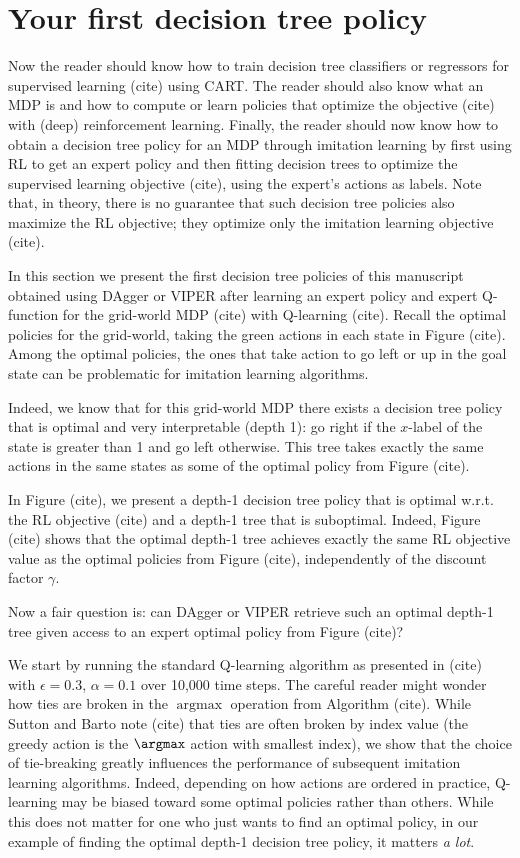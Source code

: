 \section{Your first decision tree policy}
Now the reader should know how to train decision tree classifiers or regressors for supervised learning (cite) using CART.
The reader should also know what an MDP is and how to compute or learn policies that optimize the objective (cite) with (deep) reinforcement learning.
Finally, the reader should now know how to obtain a decision tree policy for an MDP through imitation learning by first using RL to get an expert policy and then fitting decision trees to optimize the supervised learning objective (cite), using the expert's actions as labels.
Note that, in theory, there is no guarantee that such decision tree policies also maximize the RL objective; they optimize only the imitation learning objective (cite).

In this section we present the first decision tree policies of this manuscript obtained using DAgger or VIPER after learning an expert policy and expert Q-function for the grid-world MDP (cite) with Q-learning (cite).
Recall the optimal policies for the grid-world, taking the green actions in each state in Figure (cite). 
Among the optimal policies, the ones that take action to go left or up in the goal state can be problematic for imitation learning algorithms.

Indeed, we know that for this grid-world MDP there exists a decision tree policy that is optimal and very interpretable (depth 1): go right if the $x$-label of the state is greater than 1 and go left otherwise.
This tree takes exactly the same actions in the same states as some of the optimal policy from Figure (cite).

In Figure (cite), we present a depth-1 decision tree policy that is optimal w.r.t. the RL objective (cite) and a depth-1 tree that is suboptimal.
Indeed, Figure (cite) shows that the optimal depth-1 tree achieves exactly the same RL objective value as the optimal policies from Figure (cite), independently of the discount factor $\gamma$.

Now a fair question is: can DAgger or VIPER retrieve such an optimal depth-1 tree given access to an expert optimal policy from Figure (cite)?

We start by running the standard Q-learning algorithm as presented in (cite) with $\epsilon=0.3$, $\alpha=0.1$ over 10,000 time steps.
The careful reader might wonder how ties are broken in the $\operatorname{argmax}$ operation from Algorithm (cite).
While Sutton and Barto note (cite) that ties are often broken by index value (the greedy action is the $\argmax$ action with smallest index), we show that the choice of tie-breaking greatly influences the performance of subsequent imitation learning algorithms.
Indeed, depending on how actions are ordered in practice, Q-learning may be biased toward some optimal policies rather than others.
While this does not matter for one who just wants to find an optimal policy, in our example of finding the optimal depth-1 decision tree policy, it matters \textit{a lot}.

